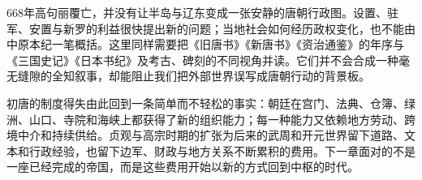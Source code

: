 668年高句丽覆亡，并没有让半岛与辽东变成一张安静的唐朝行政图。设置、驻军、安置与新罗的利益很快提出新的问题；当地社会如何经历政权变化，也不能由中原本纪一笔概括。这里同样需要把《旧唐书》《新唐书》《资治通鉴》的年序与《三国史记》《日本书纪》及考古、碑刻的不同视角并读。它们并不会合成一种毫无缝隙的全知叙事，却能阻止我们把外部世界误写成唐朝行动的背景板。

初唐的制度得失由此回到一条简单而不轻松的事实：朝廷在宫门、法典、仓簿、绿洲、山口、寺院和海峡上都获得了新的组织能力；每一种能力又依赖地方劳动、跨境中介和持续供给。贞观与高宗时期的扩张为后来的武周和开元世界留下道路、文本和行政经验，也留下边军、财政与地方关系不断累积的费用。下一章面对的不是一座已经完成的帝国，而是这些费用开始以新的方式回到中枢的时代。

